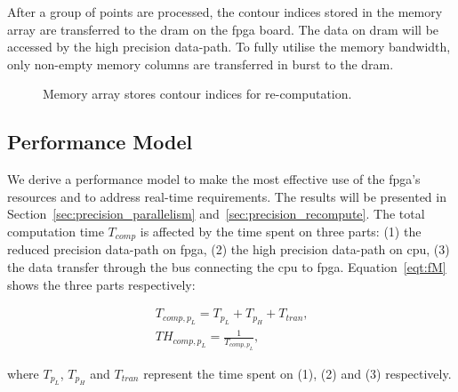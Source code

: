 After a group of points are processed, the contour indices stored in the memory array are transferred to the \gls{dram} on the \gls{fpga} board.
The data on \gls{dram} will be accessed by the high precision data-path.
To fully utilise the memory bandwidth, only non-empty memory columns are transferred in burst to the \gls{dram}.

\setcounter{subfigure}{0}
\begin{figure}[t!]
\centering
{}
\caption{Memory array stores contour indices for re-computation.}
\label{fig:memory}
\end{figure}

\subsection{Performance Model}
\label{sec:precision_model}

We derive a performance model to make the most effective use of the \gls{fpga}'s resources and to address real-time requirements.
The results will be presented in Section~\ref{sec:precision_parallelism} and~\ref{sec:precision_recompute}.
The total computation time $T_{comp}$ is affected by the time spent on three parts:
(1) the reduced precision data-path on \gls{fpga},
(2) the high precision data-path on \gls{cpu},
(3) the data transfer through the bus connecting the \gls{cpu} to \gls{fpga}.
Equation~\ref{eqt:fM} shows the three parts respectively:

\begin{equation}
\begin{aligned}
T_{comp,p_L} = T_{p_L} + T_{p_H} + T_{tran} \mbox{,} \\
TH_{comp,p_L} = \frac{1}{T_{comp,p_L}} \mbox{,}
\end{aligned}
\label{eqt:fM}
\end{equation}

where $T_{p_L}$, $T_{p_H}$ and $T_{tran}$ represent the time spent on (1), (2) and (3) respectively.

